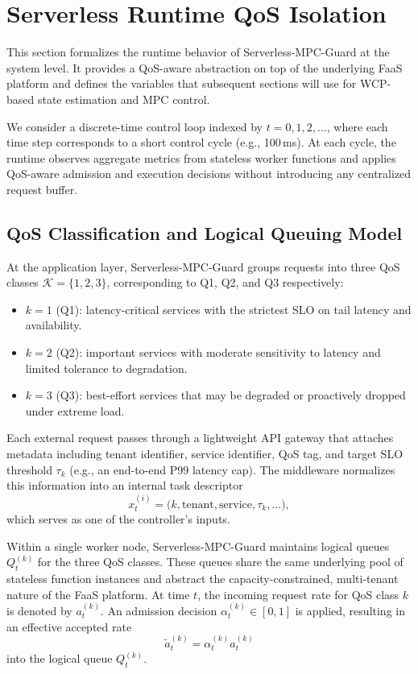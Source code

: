 \documentclass[journal]{IEEEtran}
\begin{document}
\section{Serverless Runtime QoS Isolation}
\label{sec:qos-isolation}

This section formalizes the runtime behavior of Serverless-MPC-Guard at the system level. It provides a QoS-aware abstraction on top of the underlying FaaS platform and defines the variables that subsequent sections will use for WCP-based state estimation and MPC control.

We consider a discrete-time control loop indexed by
$t = 0, 1, 2, \dots$, where each time step corresponds to a short
control cycle (e.g., 100\,ms). At each cycle, the runtime observes
aggregate metrics from stateless worker functions and applies
QoS-aware admission and execution decisions without introducing any
centralized request buffer.

\subsection{QoS Classification and Logical Queuing Model}
\label{subsec:qos-model}

At the application layer, Serverless-MPC-Guard groups requests into
three QoS classes $\mathcal{K} = \{1,2,3\}$, corresponding to Q1, Q2,
and Q3 respectively:

\begin{itemize}
  \item $k = 1$ (Q1): latency-critical services with the strictest
        SLO on tail latency and availability.
  \item $k = 2$ (Q2): important services with moderate sensitivity to
        latency and limited tolerance to degradation.
  \item $k = 3$ (Q3): best-effort services that may be degraded or
        proactively dropped under extreme load.
\end{itemize}

Each external request passes through a lightweight API gateway that
attaches metadata including tenant identifier, service identifier, QoS
tag, and target SLO threshold $\tau_k$ (e.g., an end-to-end P99
latency cap). The middleware normalizes this information into an
internal task descriptor
\[
  x_t^{(i)} = \bigl(k, \text{tenant}, \text{service}, \tau_k, \dots\bigr),
\]
which serves as one of the controller's inputs.

Within a single worker node, Serverless-MPC-Guard maintains logical
queues $Q_t^{(k)}$ for the three QoS classes. These queues share the
same underlying pool of stateless function instances and abstract the
capacity-constrained, multi-tenant nature of the FaaS platform. At
time $t$, the incoming request rate for QoS class $k$ is denoted by
$a_t^{(k)}$. An admission decision $\alpha_t^{(k)} \in [0,1]$ is
applied, resulting in an effective accepted rate
\[
  \tilde{a}_t^{(k)} = \alpha_t^{(k)} a_t^{(k)}
\]
into the logical queue $Q_t^{(k)}$.
\end{document}
